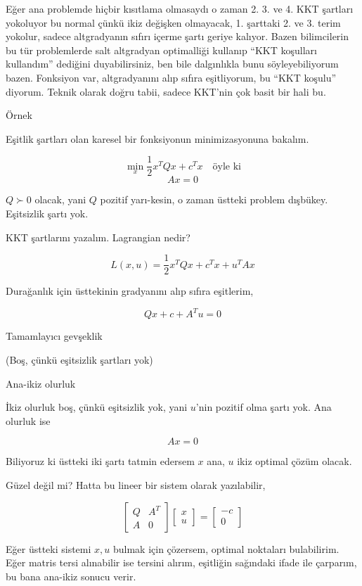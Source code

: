 \documentclass[12pt,fleqn]{article}\usepackage{../../common}
\begin{document}
Eğer ana problemde hiçbir kısıtlama olmasaydı o zaman 2. 3. ve 4. KKT
şartları yokoluyor bu normal çünkü ikiz değişken olmayacak, 1. şarttaki
2. ve 3. terim yokolur, sadece altgradyanın sıfırı içerme şartı geriye
kalıyor. Bazen bilimcilerin bu tür problemlerde salt altgradyan optimalliği
kullanıp ``KKT koşulları kullandım'' dediğini duyabilirsiniz, ben bile
dalgınlıkla bunu söyleyebiliyorum bazen. Fonksiyon var, altgradyanını alıp
sıfıra eşitliyorum, bu ``KKT koşulu'' diyorum. Teknik olarak doğru tabii,
sadece KKT'nin çok basit bir hali bu.

Örnek

Eşitlik şartları olan karesel bir fonksiyonun minimizasyonuna bakalım. 

$$
\min_x \frac{1}{2} x^T Q x + c^T x \quad \textrm{öyle ki}
$$
$$
Ax = 0
$$

$Q \succ 0$ olacak, yani $Q$ pozitif yarı-kesin, o zaman üstteki problem
dışbükey. Eşitsizlik şartı yok.

KKT şartlarını yazalım. Lagrangian nedir? 

$$
L(x,u) = \frac{1}{2} x^T Q x + c^T x + u^T A x
$$

Durağanlık için üsttekinin gradyanını alıp sıfıra eşitlerim, 

$$
Qx + c + A^T u = 0
$$

Tamamlayıcı gevşeklik

(Boş, çünkü eşitsizlik şartları yok)

Ana-ikiz olurluk

İkiz olurluk boş, çünkü eşitsizlik yok, yani $u$'nin pozitif olma şartı
yok. Ana olurluk ise 

$$
Ax = 0
$$

Biliyoruz ki üstteki iki şartı tatmin edersem $x$ ana, $u$ ikiz optimal
çözüm olacak. 

Güzel değil mi? Hatta bu lineer bir sistem olarak yazılabilir,

$$
\left[\begin{array}{ccc}
Q & A^T \\ A & 0
\end{array}\right]
\left[\begin{array}{c}
x \\ u
\end{array}\right] =
\left[\begin{array}{r}
-c \\ 0
\end{array}\right] 
$$

Eğer üstteki sistemi $x,u$ bulmak için çözersem, optimal noktaları
bulabilirim. Eğer matris tersi alınabilir ise tersini alırım, eşitliğin
sağındaki ifade ile çarparım, bu bana ana-ikiz sonucu verir. 
\end{document}
